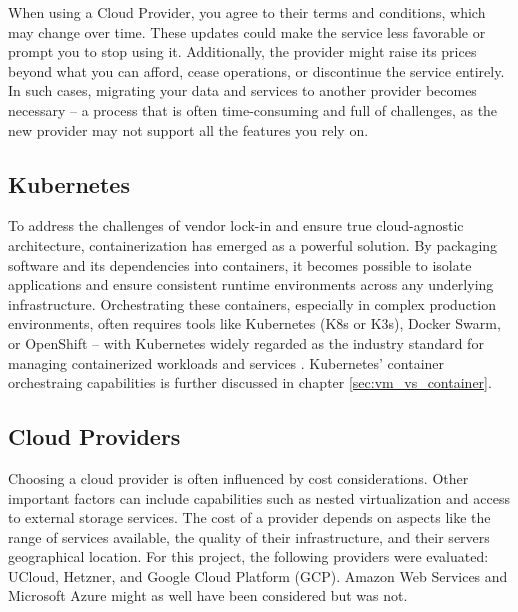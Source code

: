 When using a Cloud Provider, you agree to their terms and conditions, which may change over time. These updates could make the service less favorable or prompt you to stop using it. Additionally, the provider might raise its prices beyond what you can afford, cease operations, or discontinue the service entirely. In such cases, migrating your data and services to another provider becomes necessary -- a process that is often time-consuming and full of challenges, as the new provider may not support all the features you rely on.

\subsection{Kubernetes}

To address the challenges of vendor lock-in and ensure true cloud-agnostic architecture, containerization has emerged as a powerful solution. By packaging software and its dependencies into containers, it becomes possible to isolate applications and ensure consistent runtime environments across any underlying infrastructure. Orchestrating these containers, especially in complex production environments, often requires tools like Kubernetes (K8s or K3s), Docker Swarm, or OpenShift -- with Kubernetes widely regarded as the industry standard for managing containerized workloads and services \cite{opsramp_kubernetes_origin}. Kubernetes' container orchestraing capabilities is further discussed in chapter \ref{sec:vm_vs_container}.

\subsection{Cloud Providers}\label{sec:cloud_providers}

Choosing a cloud provider is often influenced by cost considerations. Other important factors can include capabilities such as nested virtualization and access to external storage services. The cost of a provider depends on aspects like the range of services available, the quality of their infrastructure, and their servers geographical location. For this project, the following providers were evaluated: UCloud, Hetzner, and Google Cloud Platform (GCP). Amazon Web Services and Microsoft Azure might as well have been considered but was not. 

